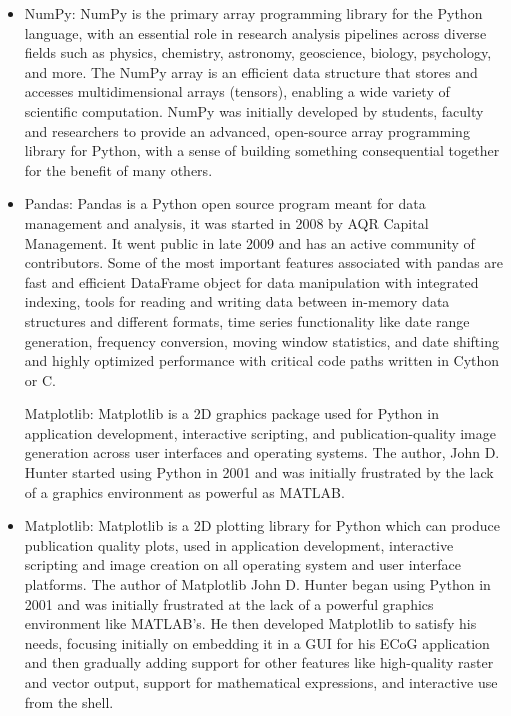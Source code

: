 \begin{itemize}
	\item NumPy: NumPy is the primary array programming library for the Python language, with an essential role in research analysis pipelines across diverse fields such as physics, chemistry, astronomy, geoscience, biology, psychology, and more. The NumPy array is an efficient data structure that stores and accesses multidimensional arrays (tensors), enabling a wide variety of scientific computation. NumPy was initially developed by students, faculty and researchers to provide an advanced, open-source array programming library for Python, with a sense of building something consequential together for the benefit of many others. \cite{python}



	\item Pandas: Pandas is a Python open source program meant for data management and analysis, it was started in 2008 by AQR Capital Management. It went public in late 2009 and has an active community of contributors. Some of the most important features associated with pandas are fast and efficient DataFrame object for data manipulation with integrated indexing, tools for reading and writing data between in-memory data structures and different formats, time series functionality like date range generation, frequency conversion, moving window statistics, and date shifting and highly optimized performance with critical code paths written in Cython or C. \cite{pandas}
	

	Matplotlib: Matplotlib is a 2D graphics package used for Python in application development, interactive scripting, and publication-quality image generation across user interfaces and operating systems. The author, John D. Hunter started using Python in 2001 and was initially frustrated by the lack of a graphics environment as powerful as MATLAB. 
	
	\item Matplotlib: Matplotlib is a 2D plotting library for Python which can produce publication quality plots, used in application development, interactive scripting and image creation on all operating system and user interface platforms. The author of Matplotlib John D. Hunter began using Python in 2001 and was initially frustrated at the lack of a powerful graphics environment like MATLAB's. He then developed Matplotlib to satisfy his needs, focusing initially on embedding it in a GUI for his ECoG application and then gradually adding support for other features like high-quality raster and vector output, support for mathematical expressions, and interactive use from the shell. %



\end{itemize}
